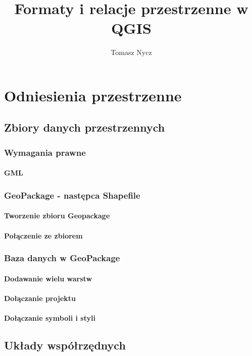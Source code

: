 \documentclass[a4paper,11pt, onecolumn, openany]{memoir}
\author{Tomasz Nycz}
\title{Formaty i relacje przestrzenne w QGIS}
\begin{document}
	\frontmatter

	\maketitle


\mainmatter
\part{Odniesienia przestrzenne}
	\chapter{Zbiory danych przestrzennych}
		\section{Wymagania prawne}
			\subsection{GML}
		\section{GeoPackage - następca Shapefile}
			\subsection{Tworzenie zbioru Geopackage}
			\subsection{Połączenie ze zbiorem}
		\section{Baza danych w GeoPackage}
			\subsection{Dodawanie wielu warstw}
			\subsection{Dołączanie projektu}
			\subsection{Dołączanie symboli i styli}

	\chapter{Układy współrzędnych}
\end{document}
